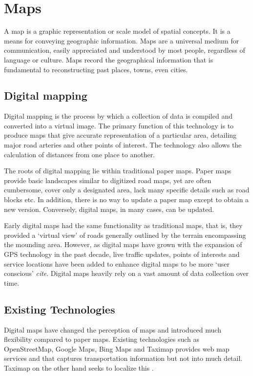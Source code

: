 \section{Maps}
A map is a graphic representation or scale model of spatial concepts. It is a means for conveying geographic information. Maps are a universal medium for communication, easily appreciated and understood by most people, regardless of language or culture. Maps record the geographical information that is fundamental to reconstructing past places, towns, even cities.

\subsection{Digital mapping}
Digital mapping is the process by which a collection of data is compiled and converted into a virtual image. The primary function of this technology is to produce maps that give accurate representation of a particular area, detailing major road arteries and other points of interest. The technology also allows the calculation of distances from one place to another.

The roots of digital mapping lie within traditional paper maps. Paper maps provide basic landscapes similar to digitized road maps, yet are often cumbersome, cover only a designated area, lack many specific details such as road blocks etc. In addition, there is no way to update a paper map except to obtain a new version. Conversely, digital maps, in many cases, can be updated.

Early digital maps had the same functionality as traditional maps, that is, they provided a `virtual view' of roads generally outlined by the terrain encompassing the mounding area. However, as digital maps have grown with the expansion of GPS technology in the past decade, live traffic updates, points of interests and service locations have been added to enhance digital maps to be more ‘user conscious’ \textit{cite}. Digital maps heavily rely on a vast amount of data collection over time.

\subsection{Existing Technologies}
Digital maps have changed the perception of maps and introduced much flexibility compared to paper maps. Existing technologies such as OpenStreetMap, Google Maps, Bing Maps and Taximap provides web map services and that captures transportation information but not into much detail. Taximap on the other hand seeks to localize this \citep{vinet2014arch}.

